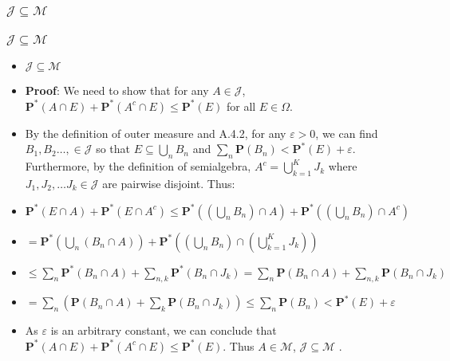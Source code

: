 \documentclass[handout]{beamer}
\newcommand{\BP}{\mathbf{P}}
\begin{document}
\subsubsection{$\mathcal{J} \subseteq \mathcal{M}$}
\frame
{
  \frametitle{$\mathcal{J} \subseteq \mathcal{M}$}

   \begin{itemize}

            \item<1->   [] \begin{Lemma} $\mathcal{J}\subseteq \mathcal{M}$ \end{Lemma}    
       
              \item<2-> []\textbf{Proof}: We need to show that for any $A\in \mathcal{J}$, $\BP^*(A\cap E)+\BP^*(A^c\cap E)\leq \BP^*(E)$ for all $E\in\Omega$. 
              
                   \item<3->  By the definition of outer measure and A.4.2, for any $\varepsilon>0$, we can find $B_1, B_2 \ldots, \in\mathcal{J}$ so that $E\subseteq \bigcup_n B_n$ and $\sum_n \BP(B_n) < \BP^*(E)+\varepsilon$. Furthermore, by the definition of semialgebra, $A^c=\bigcup_{k=1}^K J_k$ where $J_1,J_2,\ldots J_k\in \mathcal{J} $ are pairwise disjoint. Thus: 
                                      \item<4->$ \BP^*(E\cap A)+\BP^*(E\cap A^c ) \leq \BP^*((\bigcup_n B_n)\cap A)+\BP^*((\bigcup_n B_n) \cap A^c) $
                                      \item<5->[] $=\BP^*( \bigcup_n (B_n \cap A) )+\BP^*((\bigcup_n B_n)\cap ( \bigcup_{k=1}^K J_k) )$ 
                                      \item<6->[]  $\leq \sum_n \BP^*( B_n \cap A)+\sum_{n,k}\BP^*(B_n \cap  J_k)=\sum_n \BP( B_n \cap A)+\sum_{n,k}\BP(B_n \cap  J_k) $
                                     \item<7->[]  $= \sum_n (\BP( B_n \cap A)+\sum_{k}\BP(B_n \cap  J_k) )\leq \sum_n \BP( B_n)  < \BP^*(E)+\varepsilon $
                                     \item<8-> As $\varepsilon$ is an arbitrary constant, we  can conclude that $\BP^*(A\cap E)+\BP^*(A^c\cap E)\leq \BP^*(E)$. Thus $A\in \mathcal{M}$, $\mathcal{J}\subseteq \mathcal{M}$ .
                                      

                   \end{itemize}
}
\end{document}

